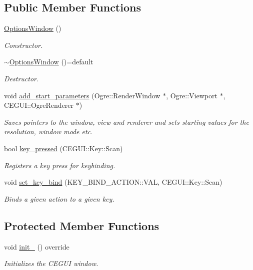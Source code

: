 \subsection*{Public Member Functions}
\begin{DoxyCompactItemize}
\item 
\hyperlink{class_options_window_a83990c03d2fec467c1131d7961f59e25}{Options\+Window} ()
\begin{DoxyCompactList}\small\item\em Constructor. \end{DoxyCompactList}\item 
\hyperlink{class_options_window_a4937f89a05eedf7bc9122b8df37ff805}{$\sim$\+Options\+Window} ()=default
\begin{DoxyCompactList}\small\item\em Destructor. \end{DoxyCompactList}\item 
void \hyperlink{class_options_window_ac629faa5a25c78141897ab2f53ec9bb4}{add\+\_\+start\+\_\+parameters} (Ogre\+::\+Render\+Window $\ast$, Ogre\+::\+Viewport $\ast$, C\+E\+G\+U\+I\+::\+Ogre\+Renderer $\ast$)
\begin{DoxyCompactList}\small\item\em Saves pointers to the window, view and renderer and sets starting values for the resolution, window mode etc. \end{DoxyCompactList}\item 
bool \hyperlink{class_options_window_a35feca3b435b2205f72138f65d20cf5d}{key\+\_\+pressed} (C\+E\+G\+U\+I\+::\+Key\+::\+Scan)
\begin{DoxyCompactList}\small\item\em Registers a key press for keybinding. \end{DoxyCompactList}\item 
void \hyperlink{class_options_window_af171624435787e543e9dcb64b5bce39e}{set\+\_\+key\+\_\+bind} (K\+E\+Y\+\_\+\+B\+I\+N\+D\+\_\+\+A\+C\+T\+I\+O\+N\+::\+V\+AL, C\+E\+G\+U\+I\+::\+Key\+::\+Scan)
\begin{DoxyCompactList}\small\item\em Binds a given action to a given key. \end{DoxyCompactList}\end{DoxyCompactItemize}
\subsection*{Protected Member Functions}
\begin{DoxyCompactItemize}
\item 
void \hyperlink{class_options_window_a88bfc1401a1113e4ab4afdb8af106682}{init\+\_\+} () override
\begin{DoxyCompactList}\small\item\em Initializes the C\+E\+G\+UI window. \end{DoxyCompactList}\end{DoxyCompactItemize}
